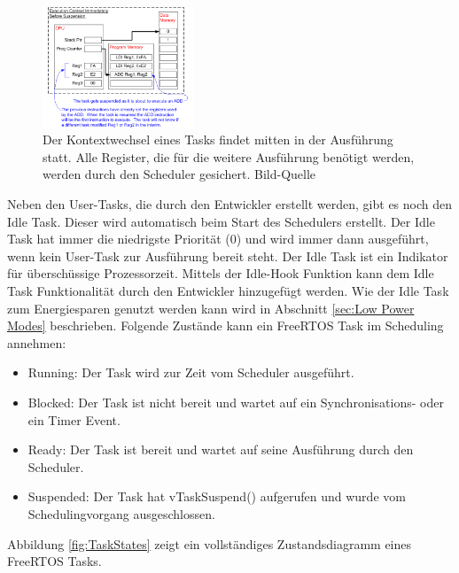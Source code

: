 \begin{figure}[ht!]
	\centering
		\includegraphics[width=0.4\textwidth]{Pictures/FreeRTOSOrg/ExeContext.png}
	\caption{Der Kontextwechsel eines Tasks findet mitten in der Aus\-füh\-rung statt. Alle Register, die für die weitere Ausführung benötigt werden, werden durch den Scheduler gesichert. Bild-Quelle~\protect{} }
	\label{fig:ContextSwitch}
\end{figure}
\newline
Neben den User-Tasks, die durch den Entwickler erstellt werden, gibt es noch den Idle Task. Dieser wird automatisch beim Start des Schedulers erstellt. Der Idle Task hat immer die niedrigste Priorität (0) und wird immer dann ausgeführt, wenn kein User-Task zur Aus\-füh\-rung bereit steht. Der Idle Task ist ein Indikator für über\-schüss\-ige Prozessorzeit. Mittels der Idle-Hook Funktion kann dem Idle Task Funktionalität durch den Entwickler hinzugefügt werden. Wie der Idle Task zum Energiesparen genutzt werden kann wird in Abschnitt \ref{sec:Low Power Modes} beschrieben.
Folgende Zu\-stän\-de kann ein FreeRTOS Task im Scheduling annehmen: 
\begin{itemize}
	\item Running: Der Task wird zur Zeit vom Scheduler ausgeführt.
	\item Blocked: Der Task ist nicht bereit und wartet auf ein Synchronisations- oder ein Timer Event.
	\item Ready: Der Task ist bereit und wartet auf seine Aus\-füh\-rung durch den Scheduler.
	\item Suspended: Der Task hat vTaskSuspend() aufgerufen und wurde vom Schedulingvorgang ausgeschlossen.
\end{itemize}
 Abbildung \ref{fig:TaskStates} zeigt ein vollständiges Zustandsdiagramm eines FreeRTOS Tasks.
